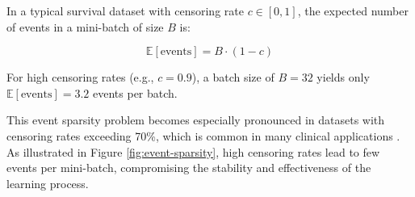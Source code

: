 \begin{definitionbox}[title=Event Sparsity in Mini-Batches]
  In a typical survival dataset with censoring rate $c \in [0,1]$, the expected number of events in a mini-batch of size $B$ is:
  
  \begin{equation}
    \mathbb{E}[\text{events}] = B \cdot (1 - c)
  \end{equation}
  
  For high censoring rates (e.g., $c = 0.9$), a batch size of $B = 32$ yields only $\mathbb{E}[\text{events}] = 3.2$ events per batch.
\end{definitionbox}

This event sparsity problem becomes especially pronounced in datasets with censoring rates exceeding 70\%, which is common in many clinical applications \parencite{ranganath2016}. As illustrated in Figure \ref{fig:event-sparsity}, high censoring rates lead to few events per mini-batch, compromising the stability and effectiveness of the learning process.

